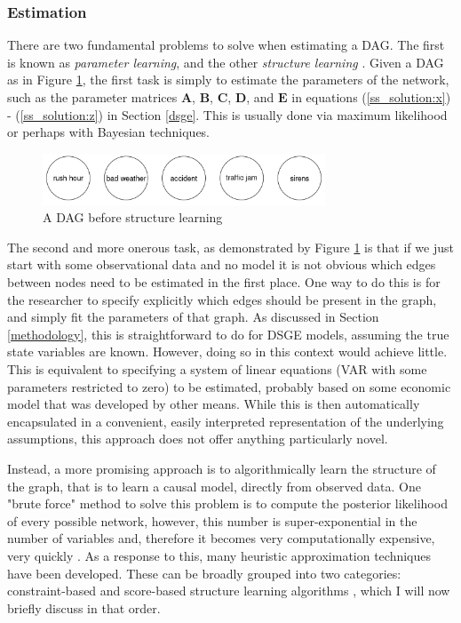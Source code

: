 \documentclass{article}
\begin{document}
\subsubsection{Estimation} \label{dag_estimation}

There are two fundamental problems to solve when estimating a DAG. The first is known as \textit{parameter learning}, and the other \textit{structure learning} \parencite{ermon_2017}. Given a DAG as in Figure \ref{dag2}, the first task is simply to estimate the parameters of the network, such as the parameter matrices $\mathbf{A}$, $\mathbf{B}$, $\mathbf{C}$, $\mathbf{D}$, and $\mathbf{E}$ in equations (\ref{ss_solution:x}) - (\ref{ss_solution:z}) in Section \ref{dsge}. This is usually done via maximum likelihood or perhaps with Bayesian techniques.

\begin{figure}
  \centering
  \includegraphics[width=0.75\textwidth]{images/trafficjam_unfit.png}
  \caption{A DAG before structure learning}
  \label{dag2}
\end{figure}

The second and more onerous task, as demonstrated by Figure \ref{dag2} is that if we just start with some observational data and no model it is not obvious which edges between nodes need to be estimated in the first place. One way to do this is for the researcher to specify explicitly which edges should be present in the graph, and simply fit the parameters of that graph. As discussed in Section \ref{methodology}, this is straightforward to do for DSGE models, assuming the true state variables are known. However, doing so in this context would achieve little. This is equivalent to specifying a system of linear equations (VAR with some parameters restricted to zero) to be estimated, probably based on some economic model that was developed by other means. While this is then automatically encapsulated in a convenient, easily interpreted representation of the underlying assumptions, this approach does not offer anything particularly novel. 

Instead, a more promising approach is to algorithmically learn the structure of the graph, that is to learn a causal model, directly from observed data. One "brute force" method to solve this problem is to compute the posterior likelihood of every possible network, however, this number is super-exponential in the number of variables and, therefore it becomes very computationally expensive, very quickly \parencite{chickering1996learning}. As a response to this, many heuristic approximation techniques have been developed. These can be broadly grouped into two categories: constraint-based and score-based structure learning algorithms \parencite{spirtes1991algorithm} \parencite{verma1991equivalence}, which I will now briefly discuss in that order. 
\end{document}
